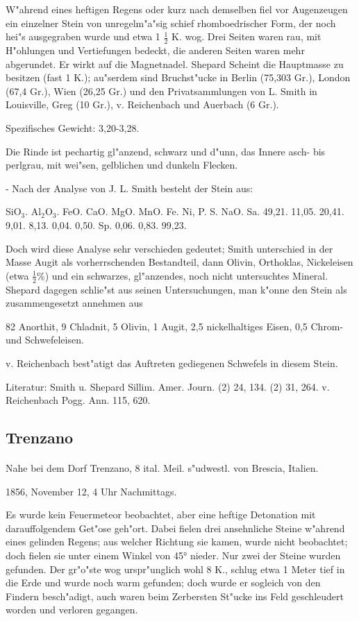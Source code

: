 \documentclass[a4paper, 11pt, oneside]{article}
\begin{document}
W"ahrend eines heftigen Regens oder kurz nach demselben fiel vor Augenzeugen ein einzelner Stein von unregelm"a"sig schief rhomboedrischer Form, der noch hei"s ausgegraben wurde und etwa 1 $\frac{1}{2}$ K. wog. Drei Seiten waren rau, mit H"ohlungen und Vertiefungen bedeckt, die anderen Seiten waren mehr abgerundet. Er wirkt auf die Magnetnadel. Shepard Scheint die Hauptmasse zu besitzen (fast 1 K.); au"serdem sind Bruchst"ucke in Berlin (75,303 Gr.), London (67,4 Gr.), Wien (26,25 Gr.) und den Privatsammlungen von L. Smith in Louisville, Greg (10 Gr.), v. Reichenbach und Auerbach (6 Gr.).

Spezifisches Gewicht: 3,20-3,28.

Die Rinde ist pechartig gl"anzend, schwarz und d"unn, das Innere asch- bis perlgrau, mit wei"sen, gelblichen und dunkeln Flecken.

- Nach der Analyse von J. L. Smith besteht der Stein aus:

SiO$_{3}$. Al$_{2}$O$_{3}$. FeO. CaO. MgO. MnO. Fe. Ni, P. S. NaO. Sa.  
49,21. 11,05. 20,41. 9,01. 8,13. 0,04. 0,50. Sp. 0,06. 0,83. 99,23.

Doch wird diese Analyse sehr verschieden gedeutet; Smith unterschied in der Masse Augit als vorherrschenden Bestandteil, dann Olivin, Orthoklas, Nickeleisen (etwa $\frac{1}{2}$\%) und ein schwarzes, gl"anzendes, noch nicht untersuchtes Mineral. Shepard dagegen schlie"st aus seinen Untersuchungen, man k"onne den Stein als zusammengesetzt annehmen aus

82 Anorthit,  
9 Chladnit,  
5 Olivin,  
1 Augit,  
2,5 nickelhaltiges Eisen,  
0,5 Chrom- und Schwefeleisen.

v. Reichenbach best"atigt das Auftreten gediegenen Schwefels in diesem Stein.

\footnotesize
Literatur: Smith u. Shepard Sillim. Amer. Journ. (2) 24, 134. (2) 31, 264. v. Reichenbach Pogg. Ann. 115, 620.

\subsection{Trenzano}
\normalsize
\paragraph{}
Nahe bei dem Dorf Trenzano, 8 ital. Meil. s"udwestl. von Brescia, Italien.

1856, November 12, 4 Uhr Nachmittags.

Es wurde kein Feuermeteor beobachtet, aber eine heftige Detonation mit darauffolgendem Get"ose geh"ort. Dabei fielen drei ansehnliche Steine w"ahrend eines gelinden Regens; aus welcher Richtung sie kamen, wurde nicht beobachtet; doch fielen sie unter einem Winkel von 45° nieder. Nur zwei der Steine wurden gefunden. Der gr"o"ste wog urspr"unglich wohl 8 K., schlug etwa 1 Meter tief in die Erde und wurde noch warm gefunden; doch wurde er sogleich von den Findern besch"adigt, auch waren beim Zerbersten St"ucke ins Feld geschleudert worden und verloren gegangen.
\end{document}
